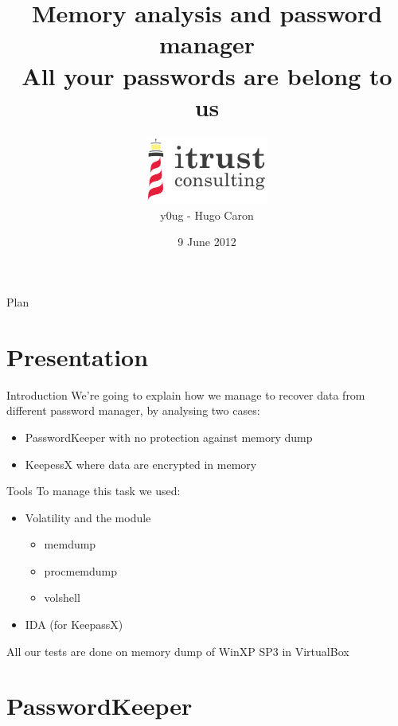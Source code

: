 \documentclass[compress]{beamer}
\title[Memory analysis and password manager]{
  Memory analysis and password manager\\
  All your passwords are belong to us
}
\author[y0ug - Hugo Caron]{\includegraphics[width=4cm,keepaspectratio]{logo}\\y0ug - Hugo Caron}
\institute{itrust.lu}
\date{9 June 2012}
\begin{document}
\begin{frame}
\titlepage
\end{frame}

\begin{frame}{Plan}
  \tableofcontents[]
\end{frame} 

\section{Presentation}
\begin{frame}[fragile]{Introduction}
We're going to explain how we manage to recover data 
from different password manager, by analysing two cases:
  \begin{itemize}
    \item PasswordKeeper with no protection against memory dump
    \item KeepessX where data are encrypted in memory
  \end{itemize}
\end{frame}

\begin{frame}{Tools}
To manage this task we used:
  \begin{itemize}
    \item Volatility and the module
      \begin{itemize}
        \item memdump
        \item procmemdump
        \item volshell
      \end{itemize}
    \item IDA (for KeepassX)
  \end{itemize}
\vspace{0.2in}
All our tests are done on memory dump of WinXP SP3 in VirtualBox
\end{frame}

\section{PasswordKeeper}
\end{document}
